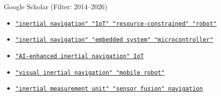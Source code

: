 \documentclass[
  a4paper,
  12pt,
  DIV=12,        %
  parskip=half,  %
  headings=small %
]{scrartcl}
\theoremstyle{definition}
\theoremstyle{definition}
\begin{document}
Google Scholar (Filter: 2014--2026)
\begin{itemize}

    \item \href{https://scholar.google.com/scholar?hl=de&as_sdt=0%2C5&as_ylo=2014&as_yhi=2026&q=%22inertial+navigation%22+%22IoT%22+%22resource-constrained%22+%22robot%22&btnG=}
    {\texttt{"inertial navigation" "IoT" "resource-constrained" "robot"}}

    \item \href{https://scholar.google.com/scholar?hl=de&as_sdt=0%2C5&as_ylo=2014&as_yhi=2026&q=%22inertial+navigation%22+%22embedded+system%22+%22microcontroller%22&btnG=}
    {\texttt{"inertial navigation" "embedded system" "microcontroller"}}

    \item \href{https://scholar.google.com/scholar?hl=de&as_sdt=0%2C5&as_ylo=2014&as_yhi=2026&q=%22AI-enhanced+inertial+navigation%22+IoT&btnG=}
    {\texttt{"AI-enhanced inertial navigation" IoT}}

    \item \href{https://scholar.google.com/scholar?hl=de&as_sdt=0%2C5&as_ylo=2014&as_yhi=2026&q=%22visual+inertial+navigation%22+%22mobile+robot%22&btnG=}
    {\texttt{"visual inertial navigation" "mobile robot"}}

    \item \href{https://scholar.google.com/scholar?hl=de&as_sdt=0%2C5&as_ylo=2014&as_yhi=2026&q=%22inertial+measurement+unit%22+%22sensor+fusion%22+navigation&btnG=}
    {\texttt{"inertial measurement unit" "sensor fusion" navigation}}

\end{itemize}
\end{document}
